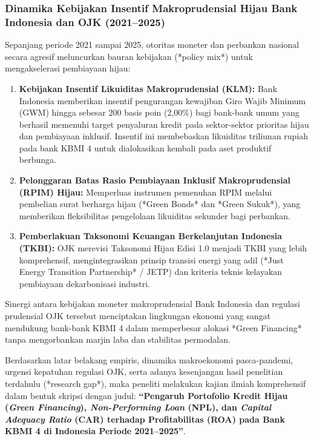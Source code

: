 \documentclass[12pt,a4paper]{article}
\numberwithin{equation}{section}
\begin{document}
\subsubsection*{Dinamika Kebijakan Insentif Makroprudensial Hijau Bank Indonesia dan OJK (2021--2025)}
\noindent
Sepanjang periode 2021 sampai 2025, otoritas moneter dan perbankan nasional secara agresif meluncurkan bauran kebijakan (*policy mix*) untuk mengakselerasi pembiayaan hijau:
\begin{enumerate}
  \item \textbf{Kebijakan Insentif Likuiditas Makroprudensial (KLM):} Bank Indonesia memberikan insentif pengurangan kewajiban Giro Wajib Minimum (GWM) hingga sebesar 200 basis poin (2,00\%) bagi bank-bank umum yang berhasil memenuhi target penyaluran kredit pada sektor-sektor prioritas hijau dan pembiayaan inklusif. Insentif ini membebaskan likuiditas triliunan rupiah pada bank KBMI 4 untuk dialokasikan kembali pada aset produktif berbunga.
  \item \textbf{Pelonggaran Batas Rasio Pembiayaan Inklusif Makroprudensial (RPIM) Hijau:} Memperluas instrumen pemenuhan RPIM melalui pembelian surat berharga hijau (*Green Bonds* dan *Green Sukuk*), yang memberikan fleksibilitas pengelolaan likuiditas sekunder bagi perbankan.
  \item \textbf{Pemberlakuan Taksonomi Keuangan Berkelanjutan Indonesia (TKBI):} OJK merevisi Taksonomi Hijau Edisi 1.0 menjadi TKBI yang lebih komprehensif, mengintegrasikan prinsip transisi energi yang adil (*Just Energy Transition Partnership* / JETP) dan kriteria teknis kelayakan pembiayaan dekarbonisasi industri.
\end{enumerate}

\noindent
Sinergi antara kebijakan moneter makroprudensial Bank Indonesia dan regulasi prudensial OJK tersebut menciptakan lingkungan ekonomi yang sangat mendukung bank-bank KBMI 4 dalam memperbesar alokasi *Green Financing* tanpa mengorbankan marjin laba dan stabilitas permodalan.

\noindent
Berdasarkan latar belakang empiris, dinamika makroekonomi pasca-pandemi, urgensi kepatuhan regulasi OJK, serta adanya kesenjangan hasil penelitian terdahulu (*research gap*), maka peneliti melakukan kajian ilmiah komprehensif dalam bentuk skripsi dengan judul: \textbf{``Pengaruh Portofolio Kredit Hijau (\emph{Green Financing}), \emph{Non-Performing Loan} (NPL), dan \emph{Capital Adequacy Ratio} (CAR) terhadap Profitabilitas (ROA) pada Bank KBMI 4 di Indonesia Periode 2021--2025''}.
\end{document}
